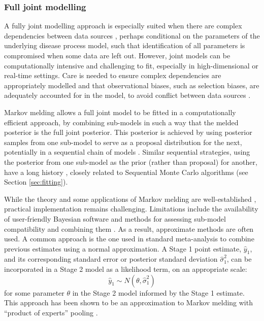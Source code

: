 \documentclass{article}
\begin{document}
\subsubsection{Full joint modelling}\label{sec:joint}

A fully joint modelling approach is especially suited when there are complex dependencies between data sources \citep{corbella2022inferring}, perhaps conditional on the parameters of the underlying disease process model, such that identification of all parameters is compromised when some data are left out. However, joint models can be computationally intensive and challenging to fit, especially in high-dimensional or real-time settings. Care is needed to ensure complex dependencies are appropriately modelled and that observational biases, such as selection biases, are adequately accounted for in the model, to avoid conflict between data sources \citep{presanis2013conflict,corbella2022inferring}. 

Markov melding \citep{goudie2019joining} allows a full joint model to be fitted in a computationally efficient approach, by combining sub-models in such a way that the melded posterior is the full joint posterior. This posterior is achieved by using posterior samples from one sub-model to serve as a proposal distribution for the next, potentially in a sequential chain of models \citep{manderson2023combining}. Similar sequential strategies, using the posterior from one sub-model as the prior (rather than proposal) for another, have a long history \citep{west1997bayesian}, closely related to Sequential Monte Carlo algorithms \citep{doucet2001introduction} (see Section \ref{sec:fitting}).

While the theory and some applications of Markov melding are well-established \citep{goudie2019joining,nicholson2022interoperability,manderson2023combining}, practical implementation remains challenging. Limitations include the availability of user-friendly Bayesian software and methods for assessing sub-model compatibility and combining them \citep{yang2025detecting}. As a result, approximate methods are often used. A common approach is the one used in standard meta-analysis \citep{borenstein2021introduction} to combine previous estimates using a normal approximation. A Stage 1 point estimate, $\hat{y}_1$, and its corresponding standard error or posterior standard deviation $\hat{\sigma}^2_1$, can be incorporated in a Stage 2 model as a likelihood term, on an appropriate scale:
$$
\hat{y}_1 \sim N(\theta, \hat{\sigma}^2_1)
$$ for some parameter $\theta$ in the Stage 2 model informed by the Stage 1 estimate. This approach has been shown to be an approximation to Markov melding with ``product of experts'' pooling \citep{goudie2019joining}.
\end{document}
